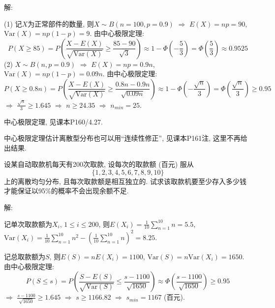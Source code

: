 \documentclass[standard]{ExBook}
\begin{document}
\begin{qitems}
    \begin{bbox}
解: 

(1) 记$X$为正常部件的数量, 则$X\sim B(n=100,p=0.9)$ $\Longrightarrow$ $E(X)=np=90$, $\mathrm{Var}(X)=np(1-p)=9$. 由中心极限定理:
$$\displaystyle P(X\geq 85)=P\left(\frac{X-E(X)}{\sqrt{\mathrm{Var}(X)}}\geq \frac{85-90}{\sqrt{3}}\right) \approx 1-\Phi\left(-\frac{5}{3}\right) = \Phi\left(\frac{5}{3}\right) \approx 0.9525$$
(2) $X\sim B(n,p=0.9)$ $\Longrightarrow$ $E(X)=np=0.9n$, $\mathrm{Var}(X)=np(1-p)=0.09n$. 由中心极限定理:
$$P(X\geq 0.8n)=P\left(\frac{X-E(X)}{\sqrt{\mathrm{Var}(X)}}\geq \frac{0.8n-0.9n}{\sqrt{0.09n}}\right) \approx 1-\Phi\left(-\frac{\sqrt{n}}{3}\right) = \Phi\left(\frac{\sqrt{n}}{3}\right) \geq 0.95$$
$\Longrightarrow$ $\displaystyle\frac{\sqrt{n}}{3} \geq 1.645$ $\Longrightarrow$ $n\geq24.35$ $\Longrightarrow$ $n_{min}=25$.

\textcolor{themeColor}{\selectfont {} 中心极限定理, 见课本P160/4.27.}

\textcolor{themeColor}{\selectfont {} 中心极限定理估计离散型分布也可以用``连续性修正'', 见课本P161注, 这里不再给出结果.}
    \end{bbox}

\vspace{-5em}

    \begin{bbox}
    \begin{shaded}
        \qitem
设某自动取款机每天有200次取款, 设每次的取款额 (百元) 服从
$$\{1,2,3,4,5,6,7,8,9,10\}$$
上的离散均匀分布, 且每次取款额是相互独立的. 试求该取款机要至少存入多少钱才能保证以95\%的概率不会出现余额不足.
    \end{shaded}
    \end{bbox}

\vspace{-5em}

    \begin{bbox}
解: 

记单次取款额为$X_i$, $1\leq i\leq 200$, 则$\displaystyle E(X_i)=\frac{1}{10}\sum\limits_{n=1}^{10}n=5.5$, $\displaystyle \mathrm{Var}(X_i)=\frac{1}{10}\sum\limits_{n=1}^{10}n^2-\left(\frac{1}{10}\sum\limits_{n=1}^{10}n\right)^2=8.25$.
    \end{bbox}

\vspace{-5em}

    \begin{bbox}
记总取款额为$S$, 则$E(S)=nE(X_i)=1100$, $\mathrm{Var}(S)=n\mathrm{Var}(X_i)=1650$. 由中心极限定理:
$$\displaystyle P(S\leq s)=P\left(\frac{S-E(S)}{\sqrt{\mathrm{Var}(S)}} \leq \frac{s-1100}{\sqrt{1650}}\right) \approx \Phi\left(\frac{s-1100}{\sqrt{1650}}\right) \geq 0.95$$
$\Longrightarrow$ $\displaystyle\frac{s-1100}{\sqrt{1650}} \geq 1.645$ $\Longrightarrow$ $s\geq 1166.82$ $\Longrightarrow$ $s_{min}=1167$ (百元).


\end{bbox}
\end{qitems}
\end{document}
